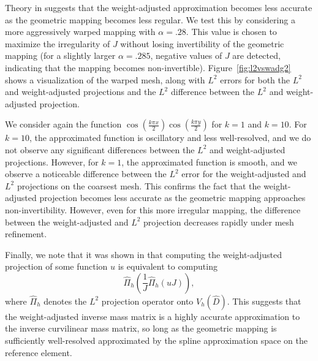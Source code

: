 \documentclass[preprint,10pt]{elsarticle}
\newcommand{\LRp}[1]{\left( #1 \right)}
\newcommand{\reviewerTwo}[1]{#1}
\begin{document}
\reviewerTwo{Theory in \cite{chan2016weight1} suggests that the weight-adjusted approximation becomes less accurate as the geometric mapping becomes less regular.  We test this by considering a more aggressively warped mapping with $\alpha = .28$.  This value is chosen to maximize the irregularity of $J$ without losing invertibility of the geometric mapping (for a slightly larger $\alpha = .285$, negative values of $J$ are detected, indicating that the mapping becomes non-invertible).  Figure~\ref{fig:l2vswadg2} shows a visualization of the warped mesh, along with  $L^2$ errors for both the  $L^2$ and weight-adjusted projections and the $L^2$ difference between the $L^2$ and weight-adjusted projection.   

We consider again the function $\cos\LRp{\frac{k\pi x}{2}}\cos\LRp{\frac{k\pi y}{2}}$ for $k=1$ and $k = 10$.  For $k=10$, the approximated function is oscillatory and less well-resolved, and we do not observe any significant differences between the $L^2$ and weight-adjusted projections.  However, for $k=1$, the approximated function is smooth, and we observe a noticeable difference between the $L^2$ error for the weight-adjusted and $L^2$ projections on the coarsest mesh.  This confirms the fact that the weight-adjusted projection becomes less accurate as the geometric mapping approaches non-invertibility.  However, even for this more irregular mapping, the difference between the weight-adjusted and $L^2$ projection decreases rapidly under mesh refinement.  

Finally, we note that it was shown in \cite{chan2016weight2} that computing the weight-adjusted projection of some function $u$ is equivalent to computing 
\[
\widehat{\Pi}_h\LRp{\frac{1}{J}\widehat{\Pi}_h \LRp{uJ}},
\]
where $\widehat{\Pi}_h$ denotes the $L^2$ projection operator onto $V_h\LRp{\widehat{D}}$.  This suggests that the weight-adjusted inverse mass matrix is a highly accurate approximation to the inverse curvilinear mass matrix, so long as the geometric mapping is sufficiently well-resolved approximated by the spline approximation space on the reference element.
}
\end{document}

